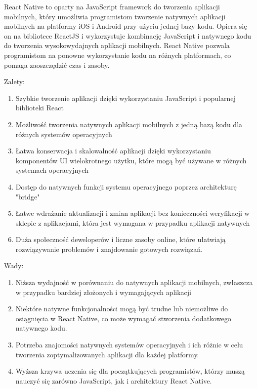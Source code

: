 \documentclass[12pt, a4paper, twoside, openany]{book}
\begin{document}
React Native to oparty na JavaScript framework do tworzenia aplikacji mobilnych, który umożliwia programistom tworzenie natywnych aplikacji mobilnych na platformy iOS i Android przy użyciu jednej bazy kodu.
Opiera się on na bibliotece ReactJS i wykorzystuje kombinację JavaScript i natywnego kodu do tworzenia wysokowydajnych aplikacji mobilnych.
React Native pozwala programistom na ponowne wykorzystanie kodu na różnych platformach, co pomaga zaoszczędzić czas i zasoby.

Zalety:
\begin{enumerate}[label=--]
    \item Szybkie tworzenie aplikacji dzięki wykorzystaniu JavaScript i popularnej biblioteki React
    \item Możliwość tworzenia natywnych aplikacji mobilnych z jedną bazą kodu dla różnych systemów operacyjnych
    \item Łatwa konserwacja i skalowalność aplikacji dzięki wykorzystaniu komponentów UI wielokrotnego użytku, które mogą być używane w różnych systemach operacyjnych
    \item Dostęp do natywnych funkcji systemu operacyjnego poprzez architekturę "bridge"
    \item Łatwe wdrażanie aktualizacji i zmian aplikacji bez konieczności weryfikacji w sklepie z aplikacjami, która jest wymagana w przypadku aplikacji natywnych
    \item Duża społeczność deweloperów i liczne zasoby online, które ułatwiają rozwiązywanie problemów i znajdowanie gotowych rozwiązań.
\end{enumerate}

Wady:
\begin{enumerate}[label=--]
    \item Niższa wydajność w porównaniu do natywnych aplikacji mobilnych, zwłaszcza w przypadku bardziej złożonych i wymagających aplikacji
    \item Niektóre natywne funkcjonalności mogą być trudne lub niemożliwe do osiągnięcia w React Native, co może wymagać stworzenia dodatkowego natywnego kodu.
    \item Potrzeba znajomości natywnych systemów operacyjnych i ich różnic w celu tworzenia zoptymalizowanych aplikacji dla każdej platformy.
    \item Wyższa krzywa uczenia się dla początkujących programistów, którzy muszą nauczyć się zarówno JavaScript, jak i architektury React Native.
\end{enumerate}
\end{document}
